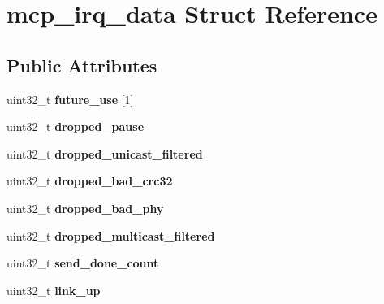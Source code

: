 \hypertarget{structmcp__irq__data}{
\section{mcp\_\-irq\_\-data Struct Reference}
\label{structmcp__irq__data}
}
\subsection*{Public Attributes}
\begin{DoxyCompactItemize}
\item 
\hypertarget{structmcp__irq__data_a78468f6faf6c8d6b917f3fbb30e8cbe7}{
uint32\_\-t {\bfseries future\_\-use} \mbox{[}1\mbox{]}}
\label{structmcp__irq__data_a78468f6faf6c8d6b917f3fbb30e8cbe7}

\item 
\hypertarget{structmcp__irq__data_a1e6a60bcec0ceb5ec1c120553546b1f7}{
uint32\_\-t {\bfseries dropped\_\-pause}}
\label{structmcp__irq__data_a1e6a60bcec0ceb5ec1c120553546b1f7}

\item 
\hypertarget{structmcp__irq__data_a2f83f9b30a9021548ed82c5d26ee17df}{
uint32\_\-t {\bfseries dropped\_\-unicast\_\-filtered}}
\label{structmcp__irq__data_a2f83f9b30a9021548ed82c5d26ee17df}

\item 
\hypertarget{structmcp__irq__data_a207b9b2d0c2c95ab442719c50049fd4f}{
uint32\_\-t {\bfseries dropped\_\-bad\_\-crc32}}
\label{structmcp__irq__data_a207b9b2d0c2c95ab442719c50049fd4f}

\item 
\hypertarget{structmcp__irq__data_a04a278d3587c4faab51d3eb1073de0b3}{
uint32\_\-t {\bfseries dropped\_\-bad\_\-phy}}
\label{structmcp__irq__data_a04a278d3587c4faab51d3eb1073de0b3}

\item 
\hypertarget{structmcp__irq__data_a594c2ea10367b2ace588aa7cb1db46bd}{
uint32\_\-t {\bfseries dropped\_\-multicast\_\-filtered}}
\label{structmcp__irq__data_a594c2ea10367b2ace588aa7cb1db46bd}

\item 
\hypertarget{structmcp__irq__data_a659d5b87d9f796ecadc0a0efd0d46587}{
uint32\_\-t {\bfseries send\_\-done\_\-count}}
\label{structmcp__irq__data_a659d5b87d9f796ecadc0a0efd0d46587}

\item 
\hypertarget{structmcp__irq__data_a8770d14c74badc3e54992327a93f0201}{
uint32\_\-t {\bfseries link\_\-up}}
\label{structmcp__irq__data_a8770d14c74badc3e54992327a93f0201}


\end{DoxyCompactItemize}
